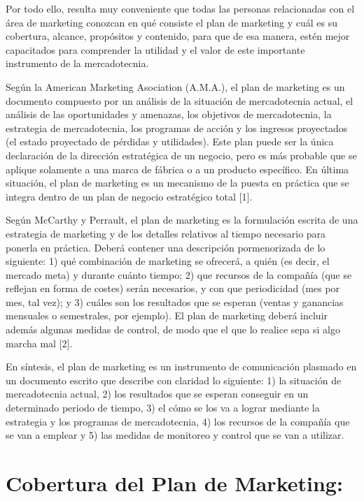 \documentclass[
]{book}
\begin{document}
Por todo ello, resulta muy conveniente que todas las personas relacionadas con el área de marketing conozcan en qué consiste el plan de marketing y cuál es su cobertura, alcance, propósitos y contenido, para que de esa manera, estén mejor capacitados para comprender la utilidad y el valor de este importante instrumento de la mercadotecnia.

Según la American Marketing Asociation (A.M.A.), el plan de marketing es un documento compuesto por un análisis de la situación de mercadotecnia actual, el análisis de las oportunidades y amenazas, los objetivos de mercadotecnia, la estrategia de mercadotecnia, los programas de acción y los ingresos proyectados (el estado proyectado de pérdidas y utilidades). Este plan puede ser la única declaración de la dirección estratégica de un negocio, pero es más probable que se aplique solamente a una marca de fábrica o a un producto específico. En última situación, el plan de marketing es un mecanismo de la puesta en práctica que se integra dentro de un plan de negocio estratégico total {[}1{]}.

Según McCarthy y Perrault, el plan de marketing es la formulación escrita de una estrategia de marketing y de los detalles relativos al tiempo necesario para ponerla en práctica. Deberá contener una descripción pormenorizada de lo siguiente: 1) qué combinación de marketing se ofrecerá, a quién (es decir, el mercado meta) y durante cuánto tiempo; 2) que recursos de la compañía (que se reflejan en forma de costes) serán necesarios, y con que periodicidad (mes por mes, tal vez); y 3) cuáles son los resultados que se esperan (ventas y ganancias mensuales o semestrales, por ejemplo). El plan de marketing deberá incluir además algunas medidas de control, de modo que el que lo realice sepa si algo marcha mal {[}2{]}.

En síntesis, el plan de marketing es un instrumento de comunicación plasmado en un documento escrito que describe con claridad lo siguiente: 1) la situación de mercadotecnia actual, 2) los resultados que se esperan conseguir en un determinado periodo de tiempo, 3) el cómo se los va a lograr mediante la estrategia y los programas de mercadotecnia, 4) los recursos de la compañía que se van a emplear y 5) las medidas de monitoreo y control que se van a utilizar.

\hypertarget{cobertura-del-plan-de-marketing}{%
\section{Cobertura del Plan de Marketing:}\label{cobertura-del-plan-de-marketing}}
\end{document}
